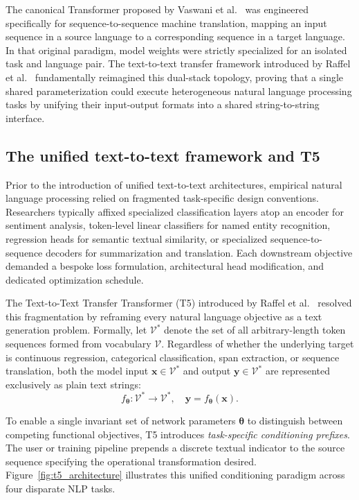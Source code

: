 \documentclass[../../../main.tex]{subfiles}
\begin{document}
The canonical Transformer proposed by Vaswani et al.~\cite{vaswani2017} was engineered specifically for sequence-to-sequence machine translation, mapping an input sequence in a source language to a corresponding sequence in a target language. In that original paradigm, model weights were strictly specialized for an isolated task and language pair. The text-to-text transfer framework introduced by Raffel et al.~\cite{raffel2020t5} fundamentally reimagined this dual-stack topology, proving that a single shared parameterization could execute heterogeneous natural language processing tasks by unifying their input-output formats into a shared string-to-string interface.


\subsection{The unified text-to-text framework and T5}
\label{subsec:t5_text_to_text}

Prior to the introduction of unified text-to-text architectures, empirical natural language processing relied on fragmented task-specific design conventions. Researchers typically affixed specialized classification layers atop an encoder for sentiment analysis, token-level linear classifiers for named entity recognition, regression heads for semantic textual similarity, or specialized sequence-to-sequence decoders for summarization and translation. Each downstream objective demanded a bespoke loss formulation, architectural head modification, and dedicated optimization schedule.

The Text-to-Text Transfer Transformer (T5) introduced by Raffel et al.~\cite{raffel2020t5} resolved this fragmentation by reframing every natural language objective as a text generation problem. Formally, let $\mathcal{V}^*$ denote the set of all arbitrary-length token sequences formed from vocabulary $\mathcal{V}$. Regardless of whether the underlying target is continuous regression, categorical classification, span extraction, or sequence translation, both the model input $\mathbf{x} \in \mathcal{V}^*$ and output $\mathbf{y} \in \mathcal{V}^*$ are represented exclusively as plain text strings:
\begin{equation}
f_{\boldsymbol{\theta}}: \mathcal{V}^* \to \mathcal{V}^*, \quad \mathbf{y} = f_{\boldsymbol{\theta}}(\mathbf{x}).
\label{eq:t5_text_to_text_mapping}
\end{equation}

To enable a single invariant set of network parameters $\boldsymbol{\theta}$ to distinguish between competing functional objectives, T5 introduces \emph{task-specific conditioning prefixes}. The user or training pipeline prepends a discrete textual indicator to the source sequence specifying the operational transformation desired. Figure~\ref{fig:t5_architecture} illustrates this unified conditioning paradigm across four disparate NLP tasks.
\end{document}
